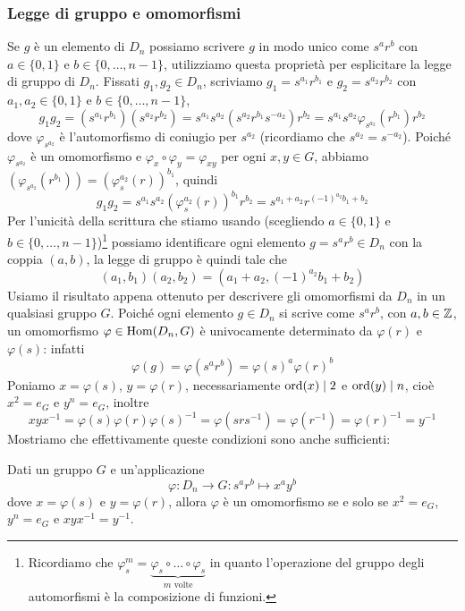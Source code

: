 \documentclass[11pt]{scrartcl}
\begin{document}
\subsubsection{Legge di gruppo e omomorfismi}

Se $g$ è un elemento di $D_n$ possiamo scrivere $g$ in modo unico come $s^ar^b$ 
con $a \in \{0, 1\}$ e $b \in \{0, \ldots, n - 1\}$, utilizziamo questa 
proprietà per esplicitare la legge di gruppo di $D_n$. \newline
Fissati $g_1, g_2 \in D_n$, scriviamo $g_1 = s^{a_1}r^{b_1}$ e $g_2 = s^{a_2}r^{b_2}$
con $a_1, a_2 \in \{0, 1\}$ e $b \in \{0, \ldots, n - 1\}$, 
\[
    g_1g_2 = (s^{a_1}r^{b_1})(s^{a_2}r^{b_2}) = s^{a_1}s^{a_2}(s^{a_2}r^{b_1}s^{-a_2})r^{b_2} = 
    s^{a_1}s^{a_2}\varphi_{s^{a_2}}(r^{b_1})r^{b_2}
\]
dove $\varphi_{s^{a_2}}$ è l'automorfismo di coniugio per $s^{a_2}$
(ricordiamo che $s^{a_2} = s^{-a_2}$). Poiché
$\varphi_{s^{a_2}}$ è un omomorfismo e $\varphi_x\circ\varphi_y = \varphi_{xy}$ per ogni $x, y \in G$,
abbiamo $(\varphi_{s^{a_2}}(r^{b_1})) = (\varphi_s^{a_2}(r))^{b_1}$, quindi
\[
    g_1g_2 = s^{a_1}s^{a_2}(\varphi_s^{a_2}(r))^{b_1}r^{b_2} = 
    s^{a_1 + a_2}r^{(-1)^{a_2}b_1 + b_2}
\]
Per l'unicità della scrittura che stiamo usando (scegliendo 
$a \in \{0, 1\}$ e $b \in \{0, \ldots, n - 1\}$)\footnote{
    Ricordiamo che $\varphi_s^m = \underset{m\text{ volte}}{\underbrace{\varphi_s\circ\ldots\circ\varphi_s}}$
    in quanto l'operazione del gruppo degli automorfismi è la composizione di 
    funzioni.} possiamo identificare 
ogni elemento $g = s^ar^b \in D_n$ con la coppia $(a, b)$, la legge di gruppo
è quindi tale che \[
    (a_1, b_1)(a_2, b_2) = (a_1 + a_2, (-1)^{a_2}b_1 + b_2)
\]
\newline 
Usiamo il risultato appena ottenuto per descrivere gli omomorfismi da $D_n$ in 
un qualsiasi gruppo $G$. Poiché ogni elemento $g \in D_n$ si scrive come
$s^ar^b$, con $a, b \in \mathbb Z$, un omomorfismo $\varphi \in \operatorname{Hom}(D_n, G)$ è univocamente
determinato da $\varphi(r)$ e $\varphi(s)$: infatti \[
    \varphi(g) = \varphi(s^ar^b) = \varphi(s)^a\varphi(r)^b
\]Poniamo $x = \varphi(s)$, $y = \varphi(r)$, necessariamente $\operatorname{ord}(x) \mid 2$
e $\operatorname{ord}(y)\mid n$, cioè $x^2 = e_G$ e $y^n = e_G$, inoltre \[
    xyx^{-1} = \varphi(s)\varphi(r)\varphi(s)^{-1} = \varphi(srs^{-1}) = 
    \varphi(r^{-1}) = \varphi(r)^{-1} = y^{-1}
\]Mostriamo che effettivamente queste condizioni sono anche sufficienti:

\begin{proposition}
    Dati un gruppo $G$ e un'applicazione
    \[
        \varphi:D_n\longrightarrow G :s^ar^b \longmapsto x^ay^b
    \]dove $x = \varphi(s)$ e $y = \varphi(r)$, allora $\varphi$ è un omomorfismo
    se e solo se $x^2 = e_G$, $y^n = e_G$ e $xyx^{-1} = y^{-1}$.
\end{proposition}
\end{document}
